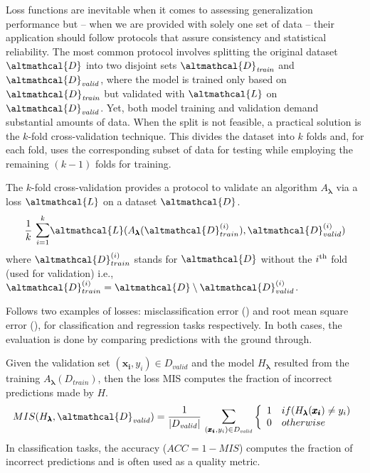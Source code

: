 Loss functions are inevitable when it comes to assessing generalization performance but -- when we are provided with solely one set of data -- their application should follow protocols that assure consistency and statistical reliability.
The most common protocol involves splitting the original dataset $\altmathcal{D}$ into two disjoint sets $\altmathcal{D}_\mathit{train}$ and $\altmathcal{D}_\mathit{valid}$, where the model is trained only based on $\altmathcal{D}_\mathit{train}$ but validated with $\altmathcal{L}$ on $\altmathcal{D}_\mathit{valid}$.
Yet, both model training and validation demand substantial amounts of data.
When the split is not feasible, a practical solution is the $k$-fold cross-validation technique.
This divides the dataset into $k$ folds and, for each fold, uses the corresponding subset of data for testing while employing the remaining $(k - 1)$ folds for training.

\begin{definition}
    The $k$-fold cross-validation provides a protocol to validate an algorithm $A_{\pmb{\lambda}}$ via a loss $\altmathcal{L}$ on a dataset $\altmathcal{D}$.
    \begin{equation*}
        \frac{1}{k}~\mathlarger{\sum}_{i=1}^{k} \altmathcal{L}(A_{\pmb{\lambda}}(\altmathcal{D}_{train}^{(i)}), \altmathcal{D}_{valid}^{(i)})
    \end{equation*}
    where $\altmathcal{D}_{train}^{(i)}$ stands for $\altmathcal{D}$ without the $i^{\textup{th}}$ fold (used for validation) i.e., $\altmathcal{D}_{train}^{(i)} = \altmathcal{D} \setminus \altmathcal{D}_{valid}^{(i)}$.
\end{definition}

Follows two examples of losses: misclassification error () and root mean square error (), for classification and regression tasks respectively.
In both cases, the evaluation is done by comparing predictions with the ground through.

\begin{example}\label{ex:misclassification}
    Given the validation set $(\pmb{x_i}, y_i) \in D_\mathit{valid}$  and the model $H_{\pmb{\lambda}}$ resulted from the training $A_{\pmb{\lambda}}(D_\mathit{train})$, then the loss MIS computes the fraction of incorrect predictions made by $H$.
    \begin{equation*}
        MIS(H_{\pmb{\lambda}}, \altmathcal{D}_\mathit{valid}) = \frac{1}{|D_\mathit{valid}|}~\mathlarger{\sum}_{(\pmb{x_i}, y_i) \in D_\mathit{valid}} \left\lbrace \begin{array}{ll}
            1 & if (H_{\pmb{\lambda}}(\pmb{x_i}) \ne y_i) \\
            0 & otherwise
        \end{array}
        \right.
    \end{equation*}
    In classification tasks, the accuracy ($ACC = 1 - MIS$) computes the fraction of incorrect predictions and is often used as a quality metric.
\end{example}


